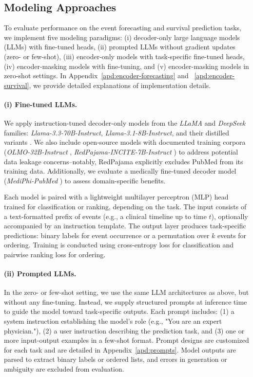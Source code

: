 \vspace{-.5em}
\subsection{Modeling Approaches}
\vspace{-.25em}
To evaluate performance on the event forecasting and survival prediction tasks, we implement five modeling paradigms: (i) decoder-only large language models (LLMs) with fine-tuned heads, (ii) prompted LLMs without gradient updates (zero- or few-shot), (iii) encoder-only models with task-specific fine-tuned heads, (iv) encoder-masking models with fine-tuning, and (v) encoder-masking models in zero-shot settings. In Appendix~\ref{apd:encoder-forecasting} and ~\ref{apd:encoder-survival}, we provide detailed explanations of implementation details.

\paragraph{(i) Fine-tuned LLMs.}  
We apply instruction-tuned decoder-only models from the \textit{LLaMA} and \textit{DeepSeek} families: \textit{Llama-3.3-70B-Instruct}, \textit{Llama-3.1-8B-Instruct}, and their distilled variants \citep{grattafiori2024llama, liu2024deepseek}. We also include open-source models with documented training corpora (\textit{OLMO-32B-Instruct} \citep{olmo20242}, \textit{RedPajama-INCITE-7B-Instruct} \citep{weber2024redpajama}) to address potential data leakage concerns--notably, RedPajama explicitly excludes PubMed from its training data. Additionally, we evaluate a medically fine-tuned decoder model (\textit{MediPhi-PubMed} \citep{corbeil2025modular}) to assess domain-specific benefits.

Each model is paired with a lightweight multilayer perceptron (MLP) head trained for classification or ranking, depending on the task. 
The input consists of a text-formatted prefix of events (e.g., a clinical timeline up to time $t$), optionally accompanied by an instruction template. 
The output layer produces task-specific predictions: binary labels for event occurrence or a permutation over $k$ events for ordering. 
Training is conducted using cross-entropy loss for classification and pairwise ranking loss for ordering.

\paragraph{(ii) Prompted LLMs.}  
In the zero- or few-shot setting, we use the same LLM architectures as above, but without any fine-tuning. 
Instead, we supply structured prompts at inference time to guide the model toward task-specific outputs. 
Each prompt includes: 
(1) a system instruction establishing the model’s role (e.g., "You are an expert physician."), 
(2) a user instruction describing the prediction task, and 
(3) one or more input-output examples in a few-shot format.
Prompt designs are customized for each task and are detailed in Appendix~\ref{apd:prompts}. Model outputs are parsed to extract binary labels or ordered lists, and errors in generation or ambiguity are excluded from evaluation.

